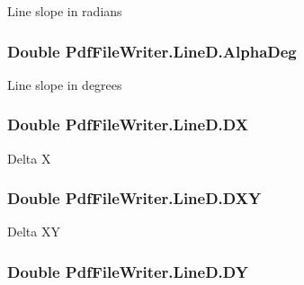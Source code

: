 Line slope in radians 

\subsubsection[{\texorpdfstring{Alpha\+Deg}{AlphaDeg}}]{\setlength{\rightskip}{0pt plus 5cm}Double Pdf\+File\+Writer.\+Line\+D.\+Alpha\+Deg\hspace{0.3cm}{\ttfamily [get]}}\hypertarget{class_pdf_file_writer_1_1_line_d_a9e6a3f25c54fb4f3815f751127f3919d}{}\label{class_pdf_file_writer_1_1_line_d_a9e6a3f25c54fb4f3815f751127f3919d}


Line slope in degrees 

\subsubsection[{\texorpdfstring{DX}{DX}}]{\setlength{\rightskip}{0pt plus 5cm}Double Pdf\+File\+Writer.\+Line\+D.\+DX\hspace{0.3cm}{\ttfamily [get]}}\hypertarget{class_pdf_file_writer_1_1_line_d_a4fa33f2e2fb3bb322284c46048120826}{}\label{class_pdf_file_writer_1_1_line_d_a4fa33f2e2fb3bb322284c46048120826}


Delta X 

\subsubsection[{\texorpdfstring{D\+XY}{DXY}}]{\setlength{\rightskip}{0pt plus 5cm}Double Pdf\+File\+Writer.\+Line\+D.\+D\+XY\hspace{0.3cm}{\ttfamily [get]}}\hypertarget{class_pdf_file_writer_1_1_line_d_aa8ac34ba7b33c19586b7c015a0f2dfd7}{}\label{class_pdf_file_writer_1_1_line_d_aa8ac34ba7b33c19586b7c015a0f2dfd7}


Delta XY 

\subsubsection[{\texorpdfstring{DY}{DY}}]{\setlength{\rightskip}{0pt plus 5cm}Double Pdf\+File\+Writer.\+Line\+D.\+DY\hspace{0.3cm}{\ttfamily [get]}}\hypertarget{class_pdf_file_writer_1_1_line_d_a96cd4a613afbf3edd66685fc7d652379}{}\label{class_pdf_file_writer_1_1_line_d_a96cd4a613afbf3edd66685fc7d652379}


